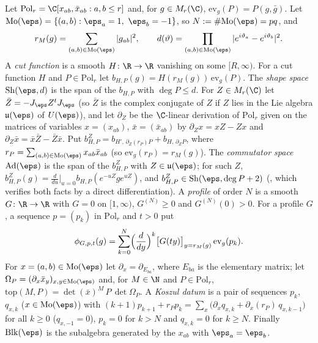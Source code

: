 \begin{definition}\label{pf:multnc:def-shapes}
Let $\mathrm{Pol}_r=\C[x_{ab},\bar x_{ab}:a,b\le r]$ and, for $g\in M_r(\C)$, $\mathrm{ev}_g(P)=P(g,\bar g)$. Let
$\mathrm{Mo}(\eps)=\{(a,b):\eps_a=1,\ \eps_b=-1\}$, so $N:=\#\mathrm{Mo}(\eps)=pq$, and
\[
r_M(g)=\sum_{(a,b)\in\mathrm{Mo}(\eps)}|g_{ab}|^2,\qquad
d(\vartheta)=\prod_{(a,b)\in\mathrm{Mo}(\eps)}|e^{i\vartheta_a}-e^{i\vartheta_b}|^2 .
\]
A \emph{cut function} is a smooth $H\colon\R\to\R$ vanishing on some $[R,\infty)$. For a cut function $H$ and
$P\in\mathrm{Pol}_r$ let $b_{H,P}(g)=H(r_M(g))\,\mathrm{ev}_g(P)$. The \emph{shape space} $\mathrm{Sh}(\eps,d)$ is the span of
the $b_{H,P}$ with $\deg P\le d$. For $Z\in M_r(\C)$ let $\bar Z=-J_\eps Z^{t}J_\eps$ (so $\bar Z$ is the complex conjugate of
$Z$ if $Z$ lies in the Lie algebra $\mathfrak u(\eps)$ of $U(\eps)$), and let $\partial_Z$ be the $\C$-linear derivation of
$\mathrm{Pol}_r$ given on the matrices of variables $x=(x_{ab})$, $\bar x=(\bar x_{ab})$ by $\partial_Zx=xZ-Zx$ and
$\partial_Z\bar x=\bar x\bar Z-\bar Z\bar x$. Put $b^Z_{H,P}=b_{H',\,\partial_Z(r_P)P}+b_{H,\,\partial_ZP}$, where
$r_P=\sum_{(a,b)\in\mathrm{Mo}(\eps)}x_{ab}\bar x_{ab}$ (so $\mathrm{ev}_g(r_P)=r_M(g)$). The \emph{commutator space}
$\mathrm{Ad}(\eps)$ is the span of the $b^Z_{H,P}$ with $Z\in\mathfrak u(\eps)$; for such $Z$,
$b^Z_{H,P}(g)=\frac{d}{du}\big|_{u=0}b_{H,P}(e^{-uZ}ge^{uZ})$, and $b^Z_{H,P}\in\mathrm{Sh}(\eps,\deg P+2)$
(, which verifies both facts by a direct
differentiation). A
\emph{profile} of order $N$ is a smooth $G\colon\R\to\R$ with $G=0$ on $[1,\infty)$, $G^{(N)}\ge0$ and $G^{(N)}(0)>0$. For a
profile $G$, a sequence $p=(p_k)$ in $\mathrm{Pol}_r$ and $t>0$ put
\[
\phi_{G,p,t}(g)=\sum_{k=0}^{N}\Bigl(\frac{d}{dy}\Bigr)^k\bigl[G(ty)\bigr]_{y=r_M(g)}\,\mathrm{ev}_g(p_k).
\]
For $x=(a,b)\in\mathrm{Mo}(\eps)$ let $\partial_x=\partial_{E_{ba}}$, where $E_{ba}$ is the elementary matrix; let
$\Omega_P=(\partial_x\bar x_y)_{x,y\in\mathrm{Mo}(\eps)}$ and, for $M\in\N$ and $P\in\mathrm{Pol}_r$,
$\mathrm{top}(M,P)=\det(\bar x)^M\,P\,\det\Omega_P$. A \emph{Koszul datum} is a pair of sequences $p_k$, $q_{x,k}$
($x\in\mathrm{Mo}(\eps)$) with $(k+1)p_{k+1}+r_Pp_k=\sum_x\bigl(\partial_xq_{x,k}+\partial_x(r_P)\,q_{x,k-1}\bigr)$ for all
$k\ge0$ ($q_{x,-1}=0$), $p_k=0$ for $k>N$ and $q_{x,k}=0$ for $k\ge N$. Finally $\mathrm{Blk}(\eps)$ is the subalgebra
generated by the $x_{ab}$ with $\eps_a=\eps_b$.
\end{definition}

